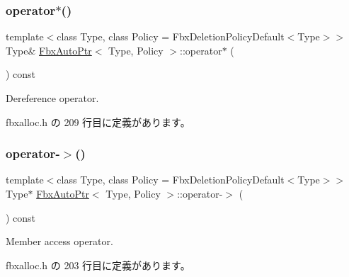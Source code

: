 \mbox{\label{class_fbx_auto_ptr_acb65f0b9499fede18cb2749fa42f40a9}} 
\subsubsection{\texorpdfstring{operator$\ast$()}{operator*()}}
{\footnotesize\ttfamily template$<$class Type, class Policy = Fbx\+Deletion\+Policy\+Default$<$\+Type$>$$>$ \\
Type\& \hyperlink{class_fbx_auto_ptr}{Fbx\+Auto\+Ptr}$<$ Type, Policy $>$\+::operator$\ast$ (\begin{DoxyParamCaption}{ }\end{DoxyParamCaption}) const\hspace{0.3cm}{\ttfamily [inline]}}



Dereference operator. 



 fbxalloc.\+h の 209 行目に定義があります。

\mbox{\label{class_fbx_auto_ptr_adfc79ea055e3de00252fb707ff5cfe31}} 
\subsubsection{\texorpdfstring{operator-\/$>$()}{operator->()}}
{\footnotesize\ttfamily template$<$class Type, class Policy = Fbx\+Deletion\+Policy\+Default$<$\+Type$>$$>$ \\
Type$\ast$ \hyperlink{class_fbx_auto_ptr}{Fbx\+Auto\+Ptr}$<$ Type, Policy $>$\+::operator-\/$>$ (\begin{DoxyParamCaption}{ }\end{DoxyParamCaption}) const\hspace{0.3cm}{\ttfamily [inline]}}



Member access operator. 



 fbxalloc.\+h の 203 行目に定義があります。

\mbox{\label{class_fbx_auto_ptr_ab9460afa835fdaa907bf0ae32f939b8e}} 
